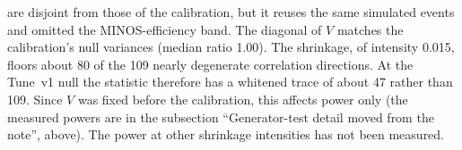 are disjoint from those of the calibration, but it reuses the same simulated events and omitted the MINOS-efficiency band. The diagonal of $V$ matches the calibration's null variances (median ratio 1.00). The shrinkage, of intensity 0.015, floors about 80 of the 109 nearly degenerate correlation directions. At the Tune~v1 null the statistic therefore has a whitened trace of about 47 rather than 109. Since $V$ was fixed before the calibration, this affects power only (the measured powers are in the subsection ``Generator-test detail moved from the note'', above). The power at other shrinkage intensities has not been measured.

